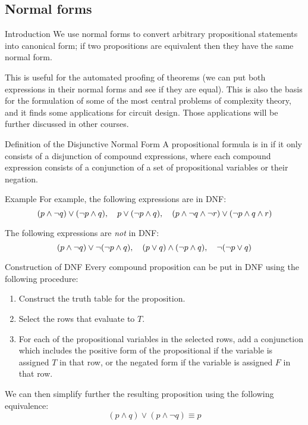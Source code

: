 \documentclass{article}
\begin{document}
\subsection{Normal forms}
\begin{parag}{Introduction}
    We use normal forms to convert arbitrary propositional statements into canonical form; if two propositions are equivalent then they have the same normal form.

    This is useful for the automated proofing of theorems (we can put both expressions in their normal forms and see if they are equal). This is also the basis for the formulation of some of the most central problems of complexity theory, and it finds some applications for circuit design. Those applications will be further discussed in other courses.
\end{parag}

\begin{parag}{Definition of the Disjunctive Normal Form}
    A propositional formula is in  if it only consists of a disjunction of compound expressions, where each compound expression consists of a conjunction of a set of propositional variables or their negation.
\end{parag}

\begin{parag}{Example}
    For example, the following expressions are in DNF: 
    \[\left(p \land \lnot q\right) \lor \left(\lnot p \land q\right), \mathspace p \lor \left(\lnot p \land q\right), \mathspace \left(p \land \lnot q \land \lnot r\right) \lor \left(\lnot p \land q \land r\right)\]
    
    The following expressions are \textit{not} in DNF:
    \[\left(p \land\lnot q\right) \lor \lnot\left(\lnot p \land q\right), \mathspace \left(p \lor q\right) \land \left(\lnot p \land q\right), \mathspace \lnot\left(\lnot p \lor q\right)\]
\end{parag}

\begin{parag}{Construction of DNF}
    Every compound proposition can be put in DNF using the following procedure: 
    \begin{enumerate}
        \item Construct the truth table for the proposition.
        \item Select the rows that evaluate to $T$.
        \item For each of the propositional variables in the selected rows, add a conjunction which includes the positive form of the propositional if the variable is assigned $T$ in that row, or the negated form if the variable is assigned $F$ in that row.
    \end{enumerate}
    
    We can then simplify further the resulting proposition using the following equivalence: 
    \[\left(p \land q\right) \lor \left(p \land \lnot q\right) \equiv p\]
\end{parag}
\end{document}
